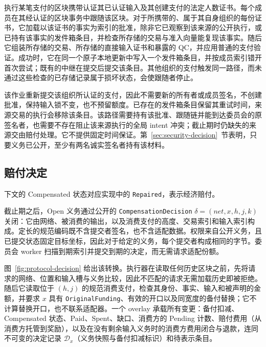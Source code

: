 执行某笔支付的区块携带认证其已认证输入及其创建支付的法定人数证书。每个成员在其经认证的区块事务中跟随该区块。对于所携带的、属于其自身组织的每份证书，它加载以该证书的事实为索引的批准，除非它已观察到该来源的公开执行，或已持有该事实的发件箱条目，并检查所存储的交易与准入向量能复现该事实。随后它组装所存储的交易、所存储的直接输入证书和暴露的 QC，并应用普通的支付验证。成功时，它在同一个原子本地更新中写入一个发件箱条目，并按成员索引错开首次尝试；既有的中继在提交后提交该条目。其他组织的支付触发同一路径，而未通过这些检查的已存储记录属于损坏状态，会使跟随者停止。

该作业重新提交该组织所认证的支付，因此不需要新的所有者或成员签名，不创建批准，保持输入锁不变，也不预留额度。已存在的发件箱条目保留其重试时间，来源交易的执行会移除该条目。该路径需要持有该批准、跟随链并能到达委员会的原签名者，也需要不存在阻止该来源执行的全局 intent 冲突；截止期时仍缺失的来源交由赔付处理。它不提供固定时间保证。第~\ref{sec:security-decision}~节表明，只要义务已公开，至少有两名诚实签名者持有该材料。
\subsection{赔付决定}
\label{sec:protocol-decision}

下文的 Compensated 状态对应实现中的 \texttt{Repaired}，表示经济赔付。

截止期之后，Open 义务通过公开的 \texttt{CompensationDecision} $\delta=(\mathit{net},x,h,j,k)$ 关闭：它由网络、被消费的输出，以及消费支付的高度、交易索引和输入索引构成。定长的规范编码既不含提交者签名，也不含适配数据。权限来自公开义务，且已提交状态固定目标坐标，因此对于给定的义务，每个提交者构成相同的字节。委员会 worker 扫描到期索引并提交到期的决定，而无需请求适配份额。

图~\ref{fig:protocol-decision} 给出该转换。执行器在读取任何历史区块之前，先将请求的网络、位置和输入槽与义务比较，因此不匹配的请求无需加载历史即被拒绝。随后它读取位于 $(h,j)$ 的规范消费支付，检查其身份、事实、输入和被声明的金额，并要求 $x$ 具有 \texttt{OriginalFunding}、有效的开口以及同宽度的备付替换；它不计算替换开口，也不联系适配器。一个 overlay 承载所有变更：备付扣减、Compensated 状态、Paid、Spent、缺口、消费方的 Pending 计数、赔付费用（从消费方托管到奖励），以及在没有剩余输入义务时的消费方费用闭合与退款，连同不可变的决定记录 $\mathcal D_x$（义务快照与备付扣减标识）和待表示条目。

